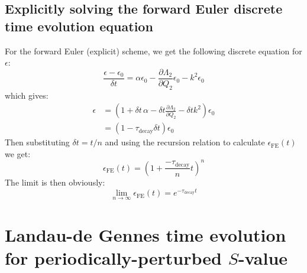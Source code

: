 \documentclass[reqno]{article}
\begin{document}
\subsection{Explicitly solving the forward Euler discrete time evolution equation}
For the forward Euler (explicit) scheme, we get the following discrete equation for $\epsilon$:
\begin{equation}
    \frac{\epsilon - \epsilon_0}{\delta t}
    =
    \alpha \epsilon_0
    - \frac{\partial \Lambda_2}{\partial Q_2} \epsilon_0
    - k^2 \epsilon_0
\end{equation}
which gives:
\begin{equation}
    \begin{split}
        \epsilon
        &=
        \left(
        1 + \delta t \, \alpha
        - \delta t \frac{\partial \Lambda_2}{\partial Q_2}
        - \delta t k^2 
        \right)
        \epsilon_0 \\
        &=
        \left(
        1 - \tau_\text{decay} \delta t
        \right)
        \epsilon_0
    \end{split}
\end{equation}
Then substituting $\delta t = t / n$ and using the recursion relation to calculate $\epsilon_\text{FE}(t)$ we get:
\begin{equation}
    \epsilon_\text{FE}(t)
    =
    \left(
    1 + \frac{-\tau_\text{decay}}{n} t 
    \right)^n
\end{equation}
The limit is then obviously:
\begin{equation}
    \lim_{n \to \infty} 
    \epsilon_\text{FE}(t)
    =
    e^{-\tau_\text{decay} t}
\end{equation}

\section{Landau-de Gennes time evolution for periodically-perturbed $S$-value}
\end{document}

